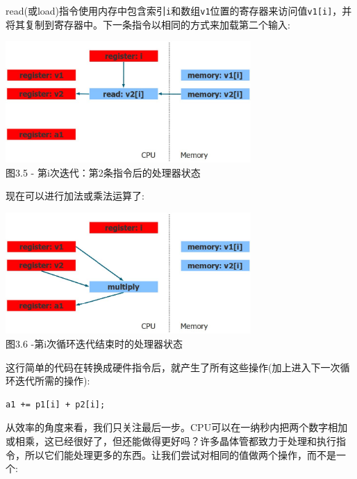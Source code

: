 read(或load)指令使用内存中包含索引\texttt{i}和数组\texttt{v1}位置的寄存器来访问值\texttt{v1[i]}，并将其复制到寄存器中。下一条指令以相同的方式来加载第二个输入:

\begin{center}
\includegraphics[width=0.7\textwidth]{content/1/chapter3/images/5.jpg}\\
图3.5 - 第i次迭代：第2条指令后的处理器状态
\end{center}

现在可以进行加法或乘法运算了:

\begin{center}
\includegraphics[width=0.7\textwidth]{content/1/chapter3/images/6.jpg}\\
图3.6 -第i次循环迭代结束时的处理器状态
\end{center}

这行简单的代码在转换成硬件指令后，就产生了所有这些操作(加上进入下一次循环迭代所需的操作):

\begin{lstlisting}[style=styleCXX]
a1 += p1[i] + p2[i];
\end{lstlisting}

从效率的角度来看，我们只关注最后一步。CPU可以在一纳秒内把两个数字相加或相乘，这已经很好了，但还能做得更好吗？许多晶体管都致力于处理和执行指令，所以它们能处理更多的东西。让我们尝试对相同的值做两个操作，而不是一个:

